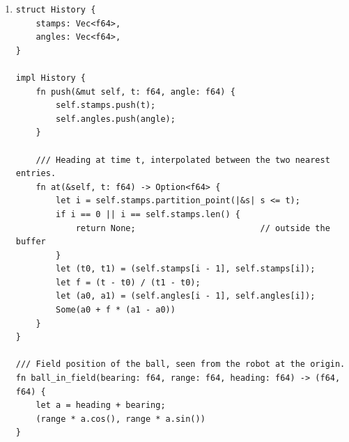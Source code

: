 \begin{enumerate}[label=\textbf{\ansnum.\arabic*}]
\begin{verbatim}
H, PHI = 0.55, math.radians(25)
F, CX, CY = 640.0, 640.0, 360.0

def to_pixel(x, y):
    dz = -H
    cam_x = -y
    cam_y = -math.sin(PHI) * x - math.cos(PHI) * dz
    cam_z = math.cos(PHI) * x - math.sin(PHI) * dz
    return CX + F * cam_x / cam_z, CY + F * cam_y / cam_z

def to_ground(u, v):
    a, b = (u - CX) / F, (v - CY) / F
    den = math.sin(PHI) + b * math.cos(PHI)
    x = H * (math.cos(PHI) - b * math.sin(PHI)) / den
    return x, -H * a / den

worst = 0.0
for i in range(12):
    for j in range(9):
        x, y = 0.5 + 0.5 * i, -2.0 + 0.5 * j
        u, v = to_pixel(x, y)
        x2, y2 = to_ground(u, v)
        worst = max(worst, abs(x - x2), abs(y - y2))
print("largest error: %.2e m" % worst)
print(to_ground(640, 300))
\end{verbatim}
prints \verb!largest error: 4.44e-15 m! (the rounding error of floating point numbers) and \verb!(1.5408191888107488, -0.0)! for the last line. The two functions are exact inverses of each other for points on the ground.
  \item
\begin{verbatim}
struct History {
    stamps: Vec<f64>,
    angles: Vec<f64>,
}

impl History {
    fn push(&mut self, t: f64, angle: f64) {
        self.stamps.push(t);
        self.angles.push(angle);
    }

    /// Heading at time t, interpolated between the two nearest entries.
    fn at(&self, t: f64) -> Option<f64> {
        let i = self.stamps.partition_point(|&s| s <= t);
        if i == 0 || i == self.stamps.len() {
            return None;                         // outside the buffer
        }
        let (t0, t1) = (self.stamps[i - 1], self.stamps[i]);
        let f = (t - t0) / (t1 - t0);
        let (a0, a1) = (self.angles[i - 1], self.angles[i]);
        Some(a0 + f * (a1 - a0))
    }
}

/// Field position of the ball, seen from the robot at the origin.
fn ball_in_field(bearing: f64, range: f64, heading: f64) -> (f64, f64) {
    let a = heading + bearing;
    (range * a.cos(), range * a.sin())
}


\end{verbatim}
\end{enumerate}
